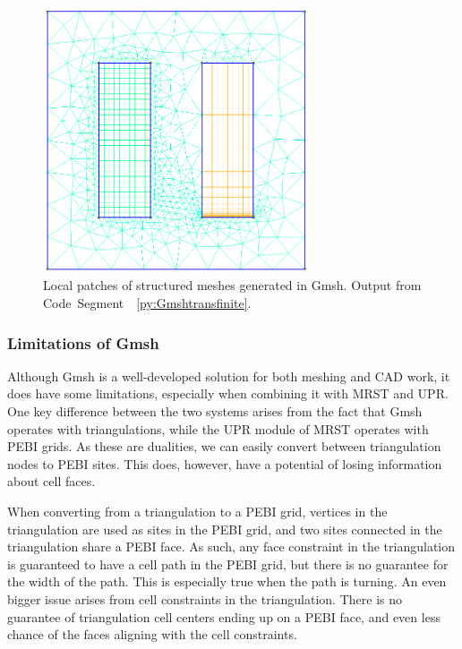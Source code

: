 \begin{figure}[htp]
    \centering
    \includegraphics[width=0.7\textwidth]{report/Images/Software/Gmsh examples/gmsh_structured_meshes.png}
    \caption[Local patches of structured meshes generated in Gmsh]{Local patches of structured meshes generated in Gmsh. Output from Code~Segment~~\ref{py:Gmshtransfinite}.}
    \label{fig:py:Gmsh-transfinite}
\end{figure}

\subsubsection{Limitations of Gmsh}
\label{sec:Gmsh-limitations}
Although Gmsh is a well-developed solution for both meshing and CAD work, it does have some limitations, especially when combining it with MRST and UPR. One key difference between the two systems arises from the fact that Gmsh operates with triangulations, while the UPR module of MRST operates with PEBI grids. As these are dualities, we can easily convert between triangulation nodes to PEBI sites. This does, however, have a potential of losing information about cell faces.

When converting from a triangulation to a PEBI grid, vertices in the triangulation are used as sites in the PEBI grid, and two sites connected in the triangulation share a PEBI face. As such, any face constraint in the triangulation is guaranteed to have a cell path in the PEBI grid, but there is no guarantee for the width of the path. This is especially true when the path is turning. An even bigger issue arises from cell constraints in the triangulation. There is no guarantee of triangulation cell centers ending up on a PEBI face, and even less chance of the faces aligning with the cell constraints.

